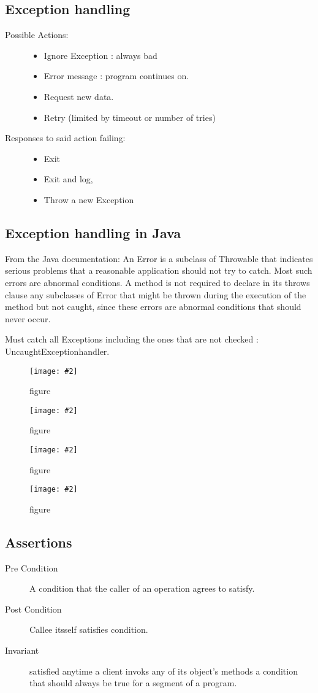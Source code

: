 \documentclass[a4paper,10pt]{scrreprt}
\newcommand{\pic}[2][figure]{\begin{figure}[h]
 \centering
 \texttt{[image: \#2]}
 \caption{#1}
\end{figure}
}
\begin{document}
\subsection{Exception handling}
\begin{description}
 \item [Possible Actions:] \begin{itemize}
                            \item Ignore Exception : always bad
                            \item Error message : program continues on.
                            \item Request new data.
                            \item Retry (limited by timeout or number of tries)
                           \end{itemize}
\item [Responses to said action failing:] \begin{itemize}
                                           \item Exit
                                           \item Exit and log,
                                           \item Throw a new Exception
                                          \end{itemize}

\end{description}

\subsection{Exception handling in Java}
From the Java documentation: An Error
is a subclass of Throwable
that indicates serious problems that a reasonable application should not try to catch. Most such errors are
abnormal conditions. A method is not required to declare in its throws clause any
subclasses of Error that might be thrown during the execution of the method but not
caught, since these errors are abnormal conditions that should never occur.

Must catch all Exceptions including the ones that are not checked : UncaughtExceptionhandler.

\pic{uex1.png}
\pic{uex2.png}
\pic{uex3.png}
\pic{uex4.png}

\subsection{Assertions}
\begin{description}
 \item [Pre Condition] A condition that the caller of an operation agrees to satisfy.
 \item [Post Condition] Callee itsself satisfies condition.
 \item [Invariant] satisfied anytime a client invoks any of its object's methods a condition that should always be true 
for a segment of a program.
\end{description}
\end{document}
